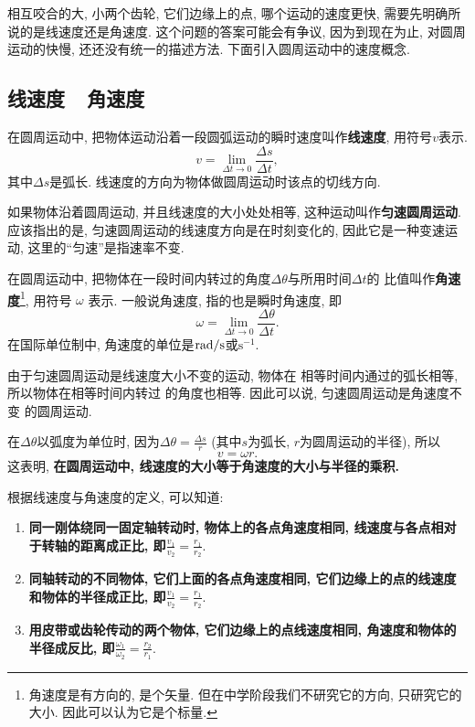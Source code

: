 \documentclass[11pt,a4paper]{ctexbook}
\begin{document}
相互咬合的大, 小两个齿轮, 它们边缘上的点, 哪个运动的速度更快, 需要先明确所说的是线速度还是角速度. 这个问题的答案可能会有争议,
因为到现在为止, 对圆周运动的快慢, 还还没有统一的描述方法. 下面引入圆周运动中的速度概念.
\subsection{线速度\ \ 角速度}

在圆周运动中, 把物体运动沿着一段圆弧运动的瞬时速度叫作\textbf{线速度}, 用符号$v$表示.
$$v=\lim_{\Delta t\rightarrow 0}\frac{\Delta{s}}{\Delta{t}}, $$
其中$\Delta s$是弧长. 线速度的方向为物体做圆周运动时该点的切线方向.

如果物体沿着圆周运动, 并且线速度的大小处处相等,
这种运动叫作\textbf{匀速圆周运动}.
应该指出的是, 匀速圆周运动的线速度方向是在时刻变化的,
因此它是一种变速运动, 这里的``匀速''是指速率不变.

在圆周运动中, 把物体在一段时间内转过的角度$\Delta{\theta}$与所用时间$\Delta{t}$的
比值叫作\textbf{角速度}\footnote{角速度是有方向的, 是个矢量. 但在中学阶段我们不研究它的方向, 只研究它的大小. 因此可以认为它是个标量.}, 用符号 $\omega$ 表示. 一般说角速度, 指的也是瞬时角速度, 即
$$\omega=\lim_{\Delta t\rightarrow 0}\frac{\Delta{\theta}}{\Delta{t}}.$$
在国际单位制中, 角速度的单位是$\rm{rad/s}$或$\mathrm{s^{-1}}$.

由于匀速圆周运动是线速度大小不变的运动, 物体在
相等时间内通过的弧长相等, 所以物体在相等时间内转过
的角度也相等. 因此可以说, 匀速圆周运动是角速度不变
的圆周运动.

在$\Delta \theta$以弧度为单位时, 因为$\Delta \theta=\displaystyle\frac{\Delta s}{r}$
(其中$s$为弧长, $r$为圆周运动的半径), 所以 $$v=\omega r.$$
这表明, \textbf{在圆周运动中, 线速度的大小等于角速度的大小与半径的乘积.}

根据线速度与角速度的定义, 可以知道:
\begin{enumerate}
	\item \textbf{同一刚体绕同一固定轴转动时, 物体上的各点角速度相同, 线速度与各点相对于转轴的距离成正比, 即}$\displaystyle\frac{v_1}{v_2} = \displaystyle\frac{r_1}{r_2}.$
	\item \textbf{同轴转动的不同物体, 它们上面的各点角速度相同, 它们边缘上的点的线速度和物体的半径成正比, 即}$\displaystyle\frac{v_1}{v_2} = \displaystyle\frac{r_1}{r_2}.$
	\item \textbf{用皮带或齿轮传动的两个物体, 它们边缘上的点线速度相同, 角速度和物体的半径成反比, 即}$\displaystyle\frac{\omega_1}{\omega_2} = \displaystyle\frac{r_2}{r_1}.$
\end{enumerate}
\end{document}
